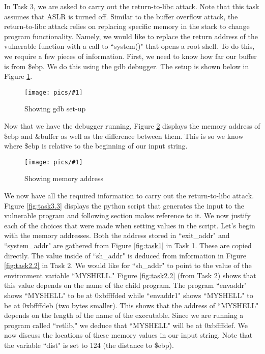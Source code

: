 \documentclass[11pt]{article}
\newcommand{\fig}[2]{ 
\begin{figure}[h]
	\centering
	\caption{#2}
	\texttt{[image: pics/\#1]}
	\label{fig:#1}
\end{figure} 
}
\begin{document}
In Task 3, we are asked to carry out the return-to-libc attack. Note that this task assumes that ASLR is turned off. Similar to the buffer overflow attack, the return-to-libc attack relies on replacing specific memory in the stack to change program functionality. Namely, we would like to replace the return address of the vulnerable function with a call to ``system()" that opens a root shell. To do this, we require a few pieces of information. First, we need to know how far our buffer is from \$ebp. We do this using the gdb debugger. The setup is shown below in Figure \ref{fig:task3.1}.

\fig{task3.1}{Showing gdb set-up}

Now that we have the debugger running, Figure \ref{fig:task3.2} displays the memory address of \$ebp and \&buffer as well as the difference between them. This is so we know where \$ebp is relative to the beginning of our input string.

\fig{task3.2}{Showing memory address}

We now have all the required information to carry out the return-to-libc attack. Figure \ref{fig:task3.3} displays the python script that generates the input to the vulnerable program and following section makes reference to it. We now justify each of the choices that were made when setting values in the script. Let's begin with the memory addresses. Both the address stored in ``exit\_addr" and ``system\_addr" are gathered from Figure \ref{fig:task1} in Task 1. These are copied directly. The value inside of ``sh\_addr" is deduced from information in Figure \ref{fig:task2.2} in Task 2. We would like for ``sh\_addr" to point to the value of the environment variable ``MYSHELL." Figure \ref{fig:task2.2} (from Task 2) shows that this value depends on the name of the child program. The program ``envaddr" shows ``MYSHELL" to be at 0xbffffded while ``envaddr1" shows ``MYSHELL" to be at 0xbffffdeb (two bytes smaller). This shows that the address of ``MYSHELL" depends on the length of the name of the executable. Since we are running a program called ``retlib," we deduce that ``MYSHELL" will be at 0xbffffdef. We now discuss the locations of these memory values in our input string. Note that the variable ``dist" is set to 124 (the distance to \$ebp).
\end{document}
